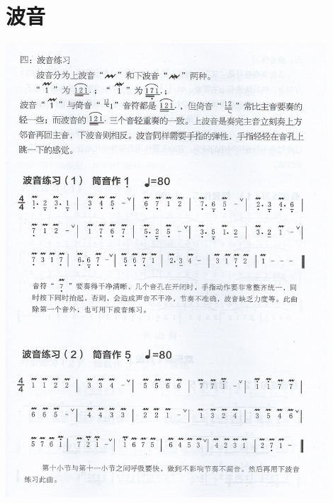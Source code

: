 \documentclass[cn,pad,twocol]{elegantbook}
\begin{document}
\section{波音}
    \includegraphics[width=0.9\textwidth]{dongxiao/Scan 10.jpeg}
\end{document}
